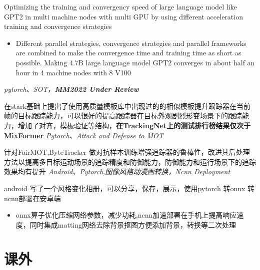 \documentclass{uniquecv}
\begin{document}
Optimizing the training and convergency speed of large language model like GPT2 in multi machine nodes with multi GPU by using different acceleration training and convergence strategies
\begin{itemize}
  \item Different parallel strategies, convergence strategies and parallel frameworks are combined to make the convergence time and training time as short as possible. Making 4.7B large language model GPT2 converges in about half an hour in 4 machine nodes with 8 V100
\end{itemize}
\textit{pytorch、SOT，\textbf{MM2022 Under Review}}
\vspace{0.4ex}

在stark基础上提出了使用高质量模板库中出现过的的相似模板提升跟踪器在当前帧的目标跟踪能力，可以很好的提高跟踪器在目标外观剧烈形变场景下的跟踪能力，增加了对齐，模板验证等结构，\textbf{在TrackingNet上的测试排行榜结果仅次于MixFormer}
\textit{Pytorch、Attack and Defense to MOT}
\vspace{0.4ex}

针对FairMOT,ByteTracker 做对抗样本训练增强追踪器的鲁棒性，改进其后处理方法以提高多目标运动场景的追踪精度和防御能力，防御能力和运行场景下的追踪效果均有提升
\textit{Android、Pytorch,图像风格动漫画转换，Ncnn Deployment}
\vspace{0.4ex}

android 写了一个风格变化相册，可以分享，保存，展示，使用pytorch 转onnx 转 ncnn部署在安卓端
\begin{itemize}
  \item onnx算子优化压缩网络参数，减少功耗,ncnn加速部署在手机上提高响应速度，同时集成matting网络去除背景抠图方便添加背景，转换等二次处理
\end{itemize}
\section{课外}
\end{document}
